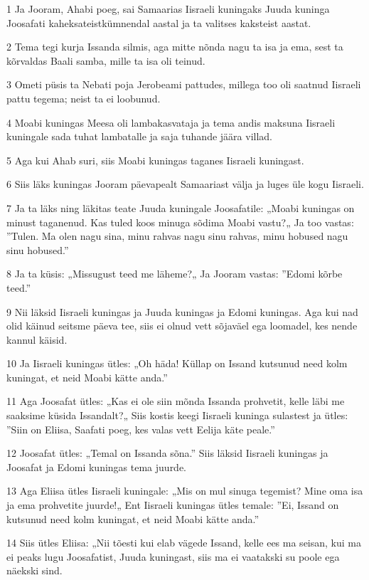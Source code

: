 \par 1 Ja Jooram, Ahabi poeg, sai Samaarias Iisraeli kuningaks Juuda kuninga Joosafati kaheksateistkümnendal aastal ja ta valitses kaksteist aastat.
\par 2 Tema tegi kurja Issanda silmis, aga mitte nõnda nagu ta isa ja ema, sest ta kõrvaldas Baali samba, mille ta isa oli teinud.
\par 3 Ometi püsis ta Nebati poja Jerobeami pattudes, millega too oli saatnud Iisraeli pattu tegema; neist ta ei loobunud.
\par 4 Moabi kuningas Meesa oli lambakasvataja ja tema andis maksuna Iisraeli kuningale sada tuhat lambatalle ja saja tuhande jäära villad.
\par 5 Aga kui Ahab suri, siis Moabi kuningas taganes Iisraeli kuningast.
\par 6 Siis läks kuningas Jooram päevapealt Samaariast välja ja luges üle kogu Iisraeli.
\par 7 Ja ta läks ning läkitas teate Juuda kuningale Joosafatile: „Moabi kuningas on minust taganenud. Kas tuled koos minuga sõdima Moabi vastu?„ Ja too vastas: ”Tulen. Ma olen nagu sina, minu rahvas nagu sinu rahvas, minu hobused nagu sinu hobused.”
\par 8 Ja ta küsis: „Missugust teed me läheme?„ Ja Jooram vastas: ”Edomi kõrbe teed.”
\par 9 Nii läksid Iisraeli kuningas ja Juuda kuningas ja Edomi kuningas. Aga kui nad olid käinud seitsme päeva tee, siis ei olnud vett sõjaväel ega loomadel, kes nende kannul käisid.
\par 10 Ja Iisraeli kuningas ütles: „Oh häda! Küllap on Issand kutsunud need kolm kuningat, et neid Moabi kätte anda.”
\par 11 Aga Joosafat ütles: „Kas ei ole siin mõnda Issanda prohvetit, kelle läbi me saaksime küsida Issandalt?„ Siis kostis keegi Iisraeli kuninga sulastest ja ütles: ”Siin on Eliisa, Saafati poeg, kes valas vett Eelija käte peale.”
\par 12 Joosafat ütles: „Temal on Issanda sõna.” Siis läksid Iisraeli kuningas ja Joosafat ja Edomi kuningas tema juurde.
\par 13 Aga Eliisa ütles Iisraeli kuningale: „Mis on mul sinuga tegemist? Mine oma isa ja ema prohvetite juurde!„ Ent Iisraeli kuningas ütles temale: ”Ei, Issand on kutsunud need kolm kuningat, et neid Moabi kätte anda.”
\par 14 Siis ütles Eliisa: „Nii tõesti kui elab vägede Issand, kelle ees ma seisan, kui ma ei peaks lugu Joosafatist, Juuda kuningast, siis ma ei vaatakski su poole ega näekski sind.
